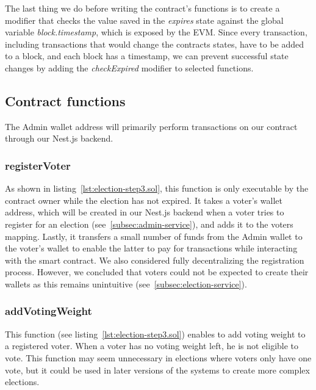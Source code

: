 The last thing we do before writing the contract's functions is to create a modifier that checks the value saved in the \emph{expires} state against the global variable \emph{block.timestamp}, which is exposed by the \gls{EVM}.
Since every transaction, including transactions that would change the contracts states, have to be added to a block, and each block has a timestamp, we can prevent successful state changes by adding the \emph{checkExpired} modifier to selected functions.

\subsection{Contract functions}\label{subsec:contract-functions}

The \gls{Admin} wallet address will primarily perform transactions on our contract through our Nest.js backend.


\subsubsection{registerVoter}

As shown in listing~\ref{lst:election-step3.sol}, this function is only executable by the contract owner while the election has not expired.
It takes a voter’s wallet address, which will be created in our Nest.js backend when a voter tries to register for an election (see~\cref{subsec:admin-service}), and adds it to the voters mapping.
Lastly, it transfers a small number of funds from the \gls{Admin} wallet to the voter’s wallet to enable the latter to pay for transactions while interacting with the smart contract.
We also considered fully decentralizing the registration process.
However, we concluded that voters could not be expected to create their wallets as this remains unintuitive (see~\cref{subsec:election-service}).

\subsubsection{addVotingWeight}

This function (see listing~\ref{lst:election-step3.sol}) enables  to add voting weight to a registered voter.
When a voter has no voting weight left, he is not eligible to vote.
This function may seem unnecessary in elections where voters only have one vote, but it could be used in later versions of the systems to create more complex elections.

